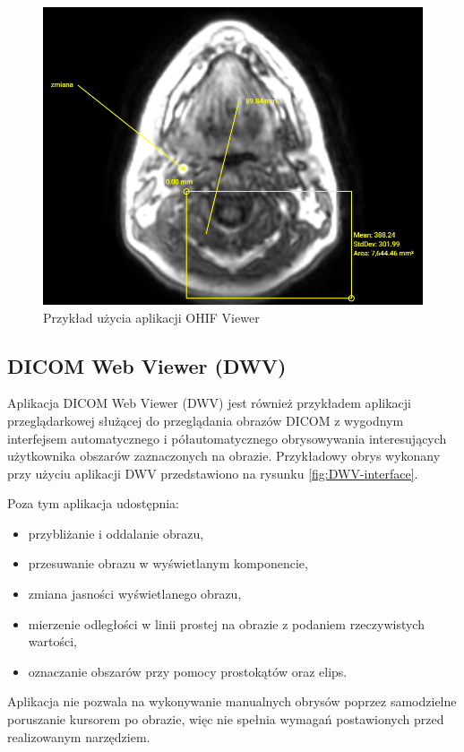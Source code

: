 \documentclass[a4paper,11pt,twoside,openright]{report}
\theoremstyle{definition}
\begin{document}
\begin{figure}[t]
	\includegraphics[width=\textwidth]{OHIF-example}
	\caption{Przykład użycia aplikacji OHIF Viewer}
    	\label{fig:OHIF-example}
\end{figure}

\subsection {DICOM Web Viewer (DWV)}

Aplikacja DICOM Web Viewer (DWV) \cite{DWV} jest również przykładem aplikacji przeglądarkowej służącej do przeglądania obrazów DICOM z wygodnym interfejsem automatycznego i półautomatycznego obrysowywania interesujących użytkownika obszarów zaznaczonych na obrazie. Przykładowy obrys wykonany przy użyciu aplikacji DWV przedstawiono na rysunku \ref{fig:DWV-interface}.

 Poza tym aplikacja udostępnia:
\begin{itemize}[noitemsep]
\item przybliżanie i oddalanie obrazu,
\item przesuwanie obrazu w wyświetlanym komponencie,
\item zmiana jasności wyświetlanego obrazu,
\item mierzenie odległości w linii prostej na obrazie z podaniem rzeczywistych wartości,
\item oznaczanie obszarów przy pomocy prostokątów oraz elips.
\end{itemize}

Aplikacja nie pozwala na wykonywanie manualnych obrysów poprzez samodzielne poruszanie kursorem po obrazie, więc nie spełnia wymagań postawionych przed realizowanym narzędziem.
\end{document}
